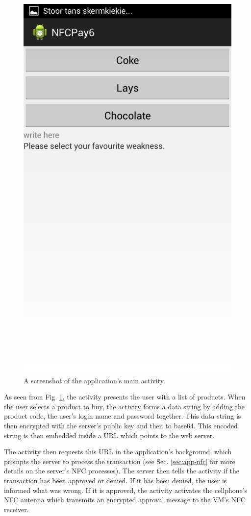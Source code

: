 \begin{figure}
 \centering 
 \includegraphics[clip = true, trim = 0 750 0 60,
 scale=0.2]{main_menu}
 \caption{A screenshot of the application's main activity.}
 \label{fig:main-activity-screenshot}
\end{figure}

As seen from Fig. \ref{fig:main-activity-screenshot}, the activity presents
the user with a list of products. When the user selects a product to buy, the
activity forms a data string by adding the product code, the user's login
name and password together. This data string is then encrypted with the
server's public key and then to base64. This encoded string
is then embedded inside a URL which points to the web server. 

The activity then requests this URL in the application's background, which prompts the
server to process the transaction (see Sec. \ref{sec:app-nfc} for more details on the
server's NFC processes). The server then tells the activity if the transaction
has been approved or denied. If it has been denied, the user is informed what was wrong. 
If it is approved, the activity activates the cellphone's NFC antenna which transmits an
encrypted approval message to the VM's NFC receiver.